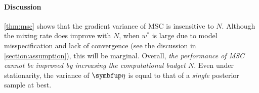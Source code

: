 
\vspace{0.04in}


\vspace{-0.1in}
\paragraph{Discussion}
\cref{thm:msc} shows that the gradient variance of MSC is insensitive to \(N\).
Although the mixing rate does improve with \(N\), when \(w^*\) is large due to model misspecification and lack of convergence (see the discussion in \cref{section:assumption}), this will be marginal.
Overall, \textit{the performance of MSC cannot be improved by increasing the computational budget \(N\)}.
Even under stationarity, the variance of \(\veta\) is equal to that of a \textit{single} posterior sample at best.

\vspace{-0.1in}
